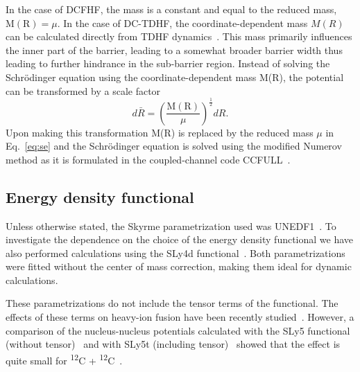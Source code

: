 In the case of DCFHF, the mass is a constant and equal to the reduced mass, $\mathrm{M(R)}=\mu$. 
In the case of DC-TDHF, the coordinate-dependent mass $M(R)$ can
be calculated directly from TDHF dynamics~\protect\citep{umar2009b}.
This mass primarily influences the inner part of the barrier, leading to a somewhat broader
barrier width thus leading to further hindrance in the sub-barrier region.
Instead of solving the Schr\"odinger equation using the coordinate-dependent mass M(R), the potential can be transformed by a scale factor~\protect\citep{umar2009b,goeke1983}
\begin{equation}
d\bar{R}=\left(\frac{\mathrm{M(R)}}{\mu}\right)^{\frac{1}{2}}dR.
\end{equation}
Upon making this transformation M(R) is replaced by the reduced mass $\mu$ in Eq.~\ref{eq:se} and the Schr\"odinger equation is solved using the modified Numerov method as it is formulated in the coupled-channel code CCFULL~\protect\citep{hagino1999}.

\subsection{Energy density functional}

Unless otherwise stated, the Skyrme parametrization used was UNEDF1~\protect\citep{kortelainen2012}.
To investigate the dependence on the choice of the energy density functional we have also performed calculations using the SLy4d functional~\protect\citep{kim1997}. 
Both parametrizations were fitted without the center of mass correction, making them ideal for dynamic calculations.

These parametrizations do not include the tensor terms of the functional.
The effects of these terms on heavy-ion fusion have been recently studied~\protect\citep{dai2014a,stevenson2016,guo2018}.
However, a comparison of the nucleus-nucleus potentials calculated with the SLy5 functional (without tensor)~\protect\citep{chabanat1998a} and with SLy5t (including tensor)~\protect\citep{colo2007}  showed that the effect is quite small for \textsuperscript{12}C + \textsuperscript{12}C~\protect\citep{guo2018b}.

